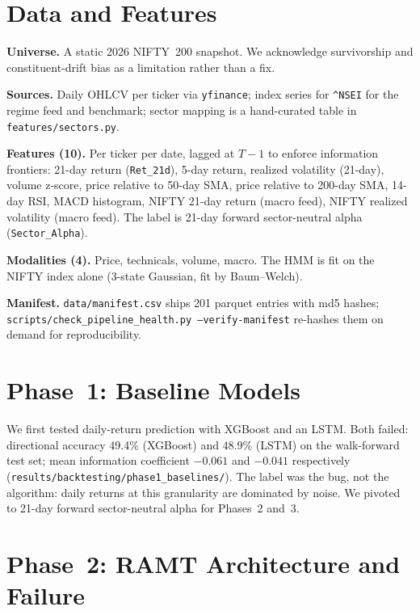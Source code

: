 \documentclass[conference]{IEEEtran}
\begin{document}
\section{Data and Features}
\textbf{Universe.} A static 2026 NIFTY~200 snapshot. We acknowledge survivorship
and constituent-drift bias as a limitation rather than a fix.

\textbf{Sources.} Daily OHLCV per ticker via \texttt{yfinance}; index series for
\texttt{\^{}NSEI} for the regime feed and benchmark; sector mapping is a hand-curated
table in \texttt{features/sectors.py}.

\textbf{Features (10).} Per ticker per date, lagged at $T{-}1$ to enforce
information frontiers: 21-day return (\texttt{Ret\_21d}), 5-day return,
realized volatility (21-day), volume z-score, price relative to 50-day SMA,
price relative to 200-day SMA, 14-day RSI, MACD histogram, NIFTY 21-day return
(macro feed), NIFTY realized volatility (macro feed). The label is 21-day
forward sector-neutral alpha (\texttt{Sector\_Alpha}).

\textbf{Modalities (4).} Price, technicals, volume, macro. The HMM is fit on the
NIFTY index alone (3-state Gaussian, fit by Baum--Welch).

\textbf{Manifest.} \texttt{data/manifest.csv} ships 201 parquet entries with
md5 hashes; \texttt{scripts/check\_pipeline\_health.py --verify-manifest}
re-hashes them on demand for reproducibility.

\section{Phase~1: Baseline Models}
We first tested daily-return prediction with XGBoost and an LSTM. Both failed:
directional accuracy 49.4\% (XGBoost) and 48.9\% (LSTM) on the walk-forward
test set; mean information coefficient $-0.061$ and $-0.041$ respectively
(\texttt{results/backtesting/phase1\_baselines/}). The label was the bug, not
the algorithm: daily returns at this granularity are dominated by noise. We
pivoted to 21-day forward sector-neutral alpha for Phases~2 and~3.

\section{Phase~2: RAMT Architecture and Failure}
\end{document}
